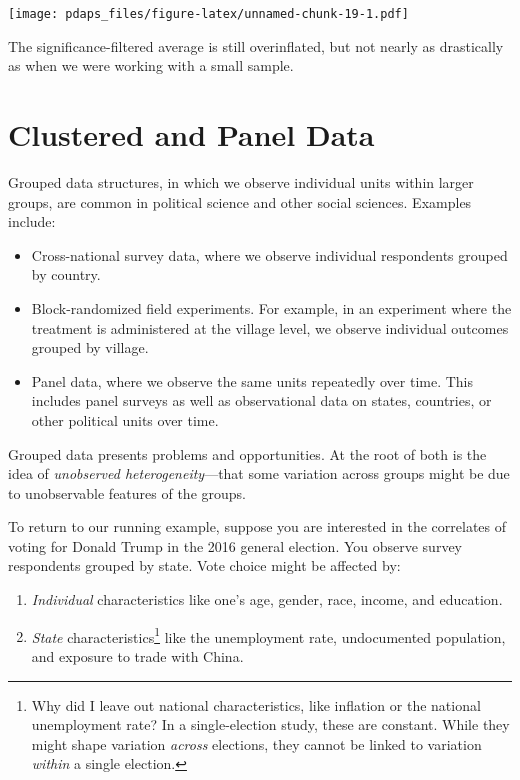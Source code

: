 \documentclass[12pt,oneside,openany]{book}
\begin{document}
\texttt{[image: pdaps\_files/figure-latex/unnamed-chunk-19-1.pdf]}

The significance-filtered average is still overinflated, but not nearly
as drastically as when we were working with a small sample.

\chapter{Clustered and Panel Data}\label{panel}

Grouped data structures, in which we observe individual units within
larger groups, are common in political science and other social
sciences. Examples include:

\begin{itemize}
\item
  Cross-national survey data, where we observe individual respondents
  grouped by country.
\item
  Block-randomized field experiments. For example, in an experiment
  where the treatment is administered at the village level, we observe
  individual outcomes grouped by village.
\item
  Panel data, where we observe the same units repeatedly over time. This
  includes panel surveys as well as observational data on states,
  countries, or other political units over time.
\end{itemize}

Grouped data presents problems and opportunities. At the root of both is
the idea of \emph{unobserved heterogeneity}---that some variation across
groups might be due to unobservable features of the groups.

To return to our running example, suppose you are interested in the
correlates of voting for Donald Trump in the 2016 general election. You
observe survey respondents grouped by state. Vote choice might be
affected by:

\begin{enumerate}
\def\labelenumi{\arabic{enumi}.}
\item
  \emph{Individual} characteristics like one's age, gender, race,
  income, and education.
\item
  \emph{State} characteristics\footnote{Why did I leave out national
    characteristics, like inflation or the national unemployment rate?
    In a single-election study, these are constant. While they might
    shape variation \emph{across} elections, they cannot be linked to
    variation \emph{within} a single election.} like the unemployment
  rate, undocumented population, and exposure to trade with China.
\end{enumerate}
\end{document}
